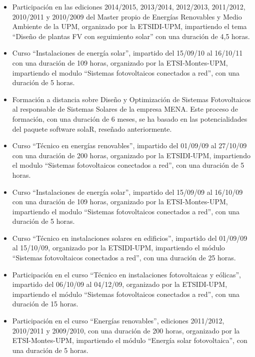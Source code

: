 \documentclass[article, a4paper]{memoir}
\begin{document}
\begin{itemize}
\item Participación en las ediciones 2014/2015, 2013/2014, 2012/2013, 2011/2012, 2010/2011 y 2010/2009 del Master propio de Energías Renovables y Medio Ambiente de la UPM, organizado por la ETSIDI-UPM, impartiendo el tema ``Diseño de plantas FV con seguimiento solar'' con una duración de 4,5 horas.

\item Curso ``Instalaciones de energía solar'', impartido del 15/09/10 al 16/10/11 con una duración de 109 horas, organizado por la ETSI-Montes-UPM, impartiendo el modulo ``Sistemas fotovoltaicos conectados a red'', con una duración de 5 horas.

\item Formación a distancia sobre Diseño y Optimización de Sistemas Fotovoltaicos al responsable de Sistemas Solares de la empresa MENA. Este proceso de formación, con una duración de 6 meses, se ha basado en las potencialidades del paquete software solaR, reseñado anteriormente.

\item Curso ``Técnico en energías renovables'', impartido del 01/09/09 al 27/10/09 con una duración de 200 horas, organizado por la ETSIDI-UPM, impartiendo el modulo ``Sistemas fotovoltaicos conectados a red'', con una duración de 5 horas.

\item Curso ``Instalaciones de energía solar'', impartido del 15/09/09 al 16/10/09 con una duración de 109 horas, organizado por la ETSI-Montes-UPM, impartiendo el modulo ``Sistemas fotovoltaicos conectados a red'', con una duración de 5 horas.

\item Curso ``Técnico en instalaciones solares en edificios'', impartido del 01/09/09 al 15/10/09, organizado por la ETSIDI-UPM, impartiendo el módulo ``Sistemas fotovoltaicos conectados a red'', con una duración de 25 horas.

\item Participación en el curso ``Técnico en instalaciones fotovoltaicas y eólicas'', impartido del 06/10/09 al 04/12/09, organizado por la ETSIDI-UPM, impartiendo el módulo ``Sistemas fotovoltaicos conectados a red'', con una duración de 15 horas.

\item Participación en el curso ``Energías renovables'', ediciones 2011/2012, 2010/2011 y 2009/2010, con una duración de 200 horas, organizado por la ETSI-Montes-UPM, impartiendo el módulo ``Energía solar fotovoltaica'', con una duración de 5 horas.
\end{itemize}
\end{document}
